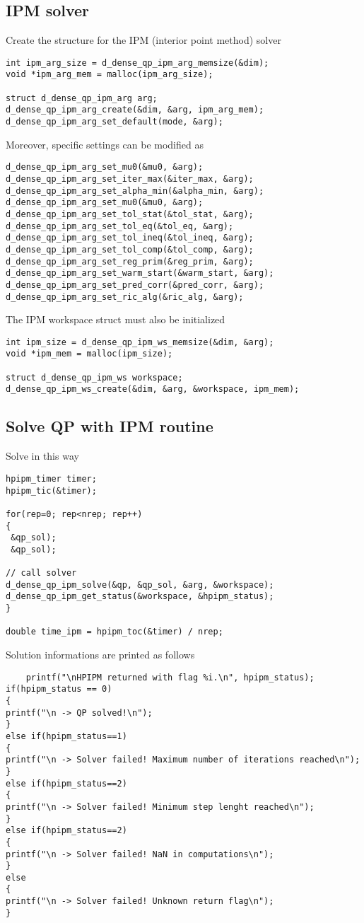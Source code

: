\documentclass[a4paper]{article}
\begin{document}
\subsection{IPM solver}
Create the structure for the IPM (interior point method) solver

\begin{verbatim}
int ipm_arg_size = d_dense_qp_ipm_arg_memsize(&dim);
void *ipm_arg_mem = malloc(ipm_arg_size);

struct d_dense_qp_ipm_arg arg;
d_dense_qp_ipm_arg_create(&dim, &arg, ipm_arg_mem);
d_dense_qp_ipm_arg_set_default(mode, &arg);
\end{verbatim}

Moreover, specific settings can be modified as 

\begin{verbatim}
d_dense_qp_ipm_arg_set_mu0(&mu0, &arg);
d_dense_qp_ipm_arg_set_iter_max(&iter_max, &arg);
d_dense_qp_ipm_arg_set_alpha_min(&alpha_min, &arg);
d_dense_qp_ipm_arg_set_mu0(&mu0, &arg);
d_dense_qp_ipm_arg_set_tol_stat(&tol_stat, &arg);
d_dense_qp_ipm_arg_set_tol_eq(&tol_eq, &arg);
d_dense_qp_ipm_arg_set_tol_ineq(&tol_ineq, &arg);
d_dense_qp_ipm_arg_set_tol_comp(&tol_comp, &arg);
d_dense_qp_ipm_arg_set_reg_prim(&reg_prim, &arg);
d_dense_qp_ipm_arg_set_warm_start(&warm_start, &arg);
d_dense_qp_ipm_arg_set_pred_corr(&pred_corr, &arg);
d_dense_qp_ipm_arg_set_ric_alg(&ric_alg, &arg);
\end{verbatim}

The IPM workspace struct must also be initialized 
\begin{verbatim}
int ipm_size = d_dense_qp_ipm_ws_memsize(&dim, &arg);
void *ipm_mem = malloc(ipm_size);

struct d_dense_qp_ipm_ws workspace;
d_dense_qp_ipm_ws_create(&dim, &arg, &workspace, ipm_mem);
\end{verbatim}
\subsection{Solve QP with IPM routine}
Solve in this way 

\begin{verbatim}
hpipm_timer timer;
hpipm_tic(&timer);

for(rep=0; rep<nrep; rep++)
{
 &qp_sol);
 &qp_sol);

// call solver
d_dense_qp_ipm_solve(&qp, &qp_sol, &arg, &workspace);
d_dense_qp_ipm_get_status(&workspace, &hpipm_status);
}

double time_ipm = hpipm_toc(&timer) / nrep;
\end{verbatim}
Solution informations are printed as follows 
\begin{verbatim}
    printf("\nHPIPM returned with flag %i.\n", hpipm_status);
if(hpipm_status == 0)
{
printf("\n -> QP solved!\n");
}
else if(hpipm_status==1)
{
printf("\n -> Solver failed! Maximum number of iterations reached\n");
}
else if(hpipm_status==2)
{
printf("\n -> Solver failed! Minimum step lenght reached\n");
}
else if(hpipm_status==2)
{
printf("\n -> Solver failed! NaN in computations\n");
}
else
{
printf("\n -> Solver failed! Unknown return flag\n");
}
\end{verbatim}
\end{document}
